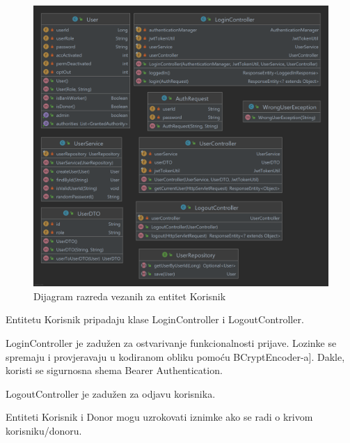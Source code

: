                 \begin{figure}[H]
                    \includegraphics[scale=0.28]{slike/user.png}
        			\centering
        			\caption{Dijagram razreda vezanih za entitet Korisnik}
        			\label{fig:hztm-stranica}
        		\end{figure}

Entitetu Korisnik pripadaju klase LoginController i LogoutController.

LoginController je zadužen za ostvarivanje funkcionalnosti prijave. Lozinke se spremaju i provjeravaju u kodiranom obliku pomoću BCryptEncoder-a]. Dakle, koristi se sigurnosna shema Bearer Authentication.

LogoutController je zadužen za odjavu korisnika.

Entiteti Korisnik i Donor mogu uzrokovati iznimke ako se radi o krivom korisniku/donoru.

